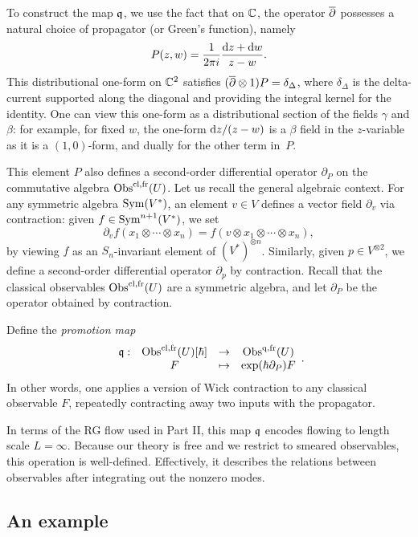 To construct the map $\frak{q}$, we use the fact that on $\mathbb C$, 
the operator $\overline{\partial}$ possesses a natural choice of propagator (or Green's function),
namely
\[
P(z,w) = \frac{1}{2\pi i}\frac{{\rm d} z + {\rm d} w}{z - w}.
\]
This distributional one-form on $\mathbb C^2$ satisfies $(\overline{\partial} \otimes 1) P = \delta_{\Delta}$, 
where $\delta_{\Delta}$ is the delta-current supported along the diagonal and providing the integral kernel for the identity.
One can view this one-form as a distributional section of the fields $\gamma$ and $\beta$:
for example, for fixed $w$, the one-form ${\rm d} z/(z-w)$ is a $\beta$ field in the $z$-variable as it is a $(1,0)$-form,
and dually for the other term in~$P$.

This element $P$ also defines a second-order differential operator $\partial_P$ on the commutative algebra ${\rm Obs}^{{\rm cl},{\rm fr}}(U)$.
Let us recall the general algebraic context.
For any symmetric algebra ${\rm Sym}(V^*)$, an element $v \in V$ defines a vector field $\partial_v$ via contraction:
given $f \in {\rm Sym}^{n+1}(V^*)$, we set 
\[
\partial_v f(x_1 \otimes \cdots \otimes x_n) = f(v \otimes x_1 \otimes \cdots \otimes x_n),
\]
by viewing $f$ as an $S_n$-invariant element of $(V^*)^{\otimes n}$.
Similarly, given $p \in V^{\otimes 2}$, we define a second-order differential operator $\partial_p$ by contraction.
Recall that the classical observables ${\rm Obs}^{{\rm cl},{\rm fr}}(U)$ are a symmetric algebra,
and let $\partial_P$ be the operator obtained by contraction.

\begin{dfn}
Define the {\em promotion map}
\[
\begin{array}{cccc}
\frak{q}:& {\rm Obs}^{{\rm cl},{\rm fr}}(U)[\hbar] &\to& {\rm Obs}^{{\rm q},{\rm fr}}(U)\\
& F & \mapsto & \exp(\hbar \partial_P)F
\end{array}.
\]
In other words, one applies a version of Wick contraction to any classical observable $F$,
repeatedly contracting away two inputs with the propagator.
\end{dfn}

\begin{rmk}
In terms of the RG flow used in Part II, this map $\frak{q}$ encodes flowing to length scale $L = \infty$.
Because our theory is free and we restrict to smeared observables, this operation is well-defined.
Effectively, it describes the relations between observables after integrating out the nonzero modes.
\end{rmk}

\subsection{An example}
\label{circ ex}

